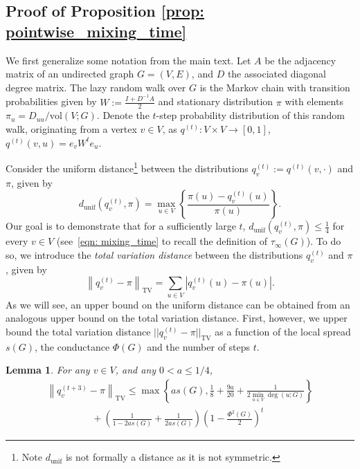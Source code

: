\documentclass[11pt,twoside]{article}
\newtheorem{lemma}{Lemma}
\theoremstyle{definition}
\newcommand{\set}[1]{\left\{#1\right\}}
\newcommand{\vol}{\mathrm{vol}}
\newcommand{\abs}[1]{\left \lvert #1 \right \rvert}
\newcommand{\norm}[1]{\left\lVert#1\right\rVert}
\newcommand{\1}{\mathbbm{1}}
\newcommand{\Abf}{A}       %
\newcommand{\Wbf}{W}
\newcommand{\Dbf}{D}
\newcommand{\Ibf}[1]{I_{#1}}
\begin{document}
\subsection{Proof of Proposition \ref{prop: pointwise_mixing_time}}
\label{sec: pointwise_mixing_time}

We first generalize some notation from the main text. Let $A$ be the adjacency matrix of an undirected graph $G = (V,E)$, and $D$ the associated diagonal degree matrix. The lazy random walk over $G$ is the Markov chain with transition probabilities given by $\Wbf := \frac{\Ibf{} + \Dbf^{-1} \Abf}{2}$ and stationary distribution $\pi$ with elements $\pi_u = D_{uu}/\vol(V;G)$.  Denote the $t$-step probability distribution of this random walk, originating from a  vertex $v \in V$, as $q^{(t)}: V \times V \to [0,1]$, $q^{(t)}(v,u) = e_v \Wbf^t e_u$.

Consider the uniform distance\footnote{Note $d_{\textrm{unif}}$ is not formally a distance as it is not symmetric.} between the distributions $q_v^{(t)} := q^{(t)}(v,\cdot)$ and $\pi$, given by
\begin{equation*}
d_{\textrm{unif}}(q_v^{(t)},\pi) = \max_{u \in V} \set{\frac{\pi(u) - q_v^{(t)}(u)}{\pi(u)}}.
\end{equation*}
Our goal is to demonstrate that for a sufficiently large $t$, $d_{\textrm{unif}}(q_v^{(t)},\pi) \leq \frac{1}{4}$ for every $v \in V$ (see~\eqref{eqn: mixing_time} to recall the definition of $\tau_{\infty}(G)$). To do so, we introduce the \emph{total variation distance} between the distributions $q_v^{(t)}$ and $\pi$, given by
\begin{equation*}
\norm{q_v^{(t)} - \pi}_{\mathrm{TV}} = \sum_{u \in V} \abs{q_v^{(t)}(u) - \pi(u)}.
\end{equation*}
As we will see, an upper bound on the uniform distance can be obtained from an analogous upper bound on the total variation distance. First, however, we upper bound the total variation distance $||q_v^{(t)} - \pi||_{\mathrm{TV}}$ as a function of the local spread $s(G)$, the conductance $\Phi(G)$ and the number of steps $t$.
\begin{lemma}
	\label{lem: tv_mixing_time}
	For any $v \in V$, and any $0 < a \leq 1/4$,
	\begin{align}
	\norm{q_v^{(t + 3)} - \pi}_{\mathrm{TV}} \leq \max\set{as(G), \frac{1}{8} + \frac{9a}{20} + \frac{1}{2 \min_{u \in V} \deg(u;G)}} 
	\nonumber \\
	~~~~~~~~~~~~~~~~~~~~~ + \left(\frac{1}{1 - 2as(G)} +  \frac{1}{2 as(G)}\right) \left(1 - \frac{\Phi^2(G)}{2}\right)^t \label{eqn: tv_mixing_time}
	\end{align}
\end{lemma}
\end{document}

